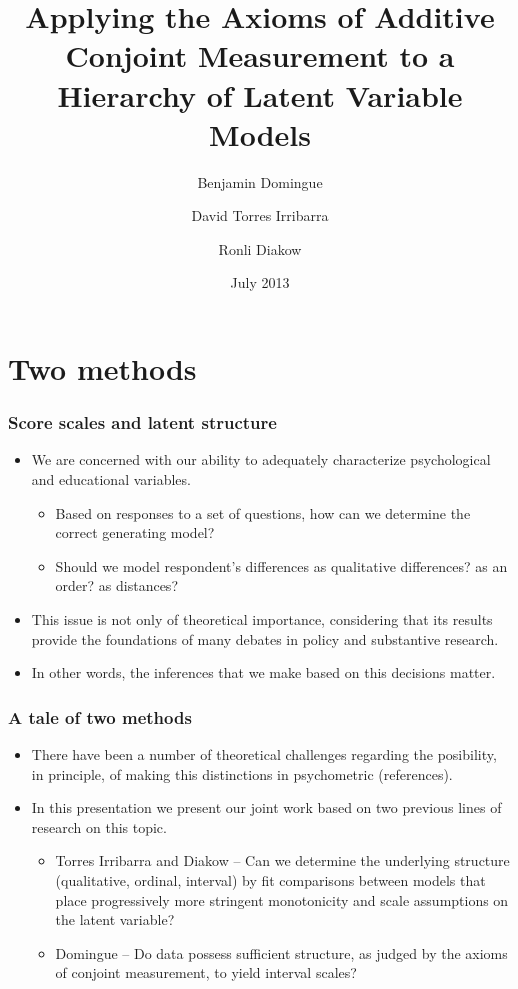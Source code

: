 \documentclass[10pt,serif,professionalfont]{beamer}
\title{Applying the Axioms of Additive Conjoint Measurement to a Hierarchy of Latent Variable Models}
\author{Benjamin Domingue\inst{1} \and David Torres Irribarra\inst{2} \and Ronli Diakow\inst{3}}
\date{July 2013}
\institute[University of California, Berkeley]{
  \inst{1} University of Colorado at Boulder \and
  \inst{2} University of California, Berkeley \and
  \inst{3} New York University}
\begin{document}
\frame{\maketitle}

\section{Two methods}
\begin{frame}
    \frametitle{Score scales and latent structure}

    \begin{itemize}
        \item We are concerned with our ability to adequately characterize psychological and educational variables.
        \begin{itemize}
            \item Based on responses to a set of questions, how can we determine the correct generating model?
            \item Should we model respondent's differences as qualitative differences? as an order? as distances?
        \end{itemize}
        \item This issue is not only of theoretical importance, considering that its results provide the foundations of many debates in policy and substantive research.
            \item In other words, the inferences that we make based on this decisions matter.
    \end{itemize}
\end{frame}

\begin{frame}
    \frametitle{A tale of two methods}


    \begin{itemize}
            
        \item There have been a number of theoretical challenges regarding the posibility, in principle, of making this distinctions in psychometric (references).
        \item In this presentation we present our joint work based on two previous lines of research on this topic.
        \begin{itemize}
             \item Torres Irribarra and Diakow -- Can we determine the underlying structure (qualitative, ordinal, interval) by fit comparisons between models that place progressively more stringent monotonicity and scale assumptions on the latent variable?
            \item Domingue -- Do data possess sufficient structure, as judged by the axioms of conjoint measurement, to yield interval scales?
         \end{itemize} 
    \end{itemize}

\end{frame}
\end{document}
